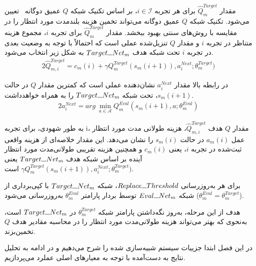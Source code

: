 مقدار $\hat{Q}_m^{Target}$ برای هر تجربه $i \in \mathcal{I}$، بر اساس تکنیک شبکه $Q$ عمیق دوگانه~\cite{wang2016dueling} تعیین می‌شود. تکنیک شبکه $Q$ عمیق دوگانه می‌تواند تخمین هزینه بلندمدت مورد انتظار را در مقایسه با روش‌های سنتی بهبود ببخشد. مقدار $\hat{Q}_m^{Target}$ برای تجربه $i$، مجموع هزینه متناظر در تجربه $i$ و مقدار $Q$ تنزیل‌شده عملی است که احتمالاً با توجه به وضعیت بعدی در تجربه $i$ تحت شبکه هدف $Target\rule{0.25cm}{0.15mm}Net_m$ ‌به شکل زیر انتخاب می‌شود.
\begin{alignat}{2}
	\hat{Q}_{m,i}^{Target} = c_m(i) + \gamma Q_m^{Target}(s_m(i+1)), a_i^{Next}; \theta_m^{Target})
	\label{64}  
\end{alignat}  

در رابطه بالا مقدار $a_i^{Next}$ نشان‌دهنده عملی است که کمترین مقدار $Q$ در حالت $s_m(i+1)$، تحت شبکه $Target\rule{0.25cm}{0.15mm}Net_m$ را به همراه خواهدداشت. 
\begin{alignat}{2}
	a_i^{Next} = arg \  \min\limits_{a \in \mathcal{A}} Q_m^{Eval}(s_m(i+1), a; \theta_m^{Eval})
	\label{65}  
\end{alignat}  





به طور شهودی، برای تجربه i، مقدار $Q$ هدف $\hat{Q}_{m,i}^{Target}$، هزینه طولانی مدت مورد انتظار عمل $a_m(i)$ در حالت $s_m(i)$‌ را نشان می‌دهد. این مقدار خلاصه‌ای از هزینه واقعی ثبت‌شده در تجربه $i$، یعنی $c_m(i)$ و همچنین هزینه تقریبی طولانی‌مدت مورد انتظار آینده بر اساس شبکه هدف $Target\rule{0.25cm}{0.15mm}Net_m$ یعنی $\gamma Q_m^{Target}(s_m(i+1)), a_i^{Next}; \theta_m^{Target})$ است. 


برای هر به‌روزرسانی $Replace\rule{0.25cm}{0.15mm}Threshold$، شبکه $Target\rule{0.25cm}{0.15mm}Net_m$ با کپی‌برداری از شبکه $Eval\rule{0.25cm}{0.15mm}Net_m$  توسط بردار پارامتر $\theta_m^{Eval}$ به‌روزرسانی می‌شود
 ($\theta_m^{Eval} = \theta_m^{Target}$).  


هدف از این مرحله، به‌روز نگه‌داشتن پارامتر شبکه $\theta_m^{Target}$ در $Target\rule{0.25cm}{0.15mm}Net_m$ است، به‌نحوی که بهتر می‌تواند هزینه طولانی‌مدت مورد انتظار را در محاسبه مقادیر هدف $Q$ تخمین‌بزند.








در این فصل ابتدا جزییات سیستم شبیەسازی شده را شرح می‌دهیم و در ادامه به تحلیل نتایج به‌ دست‌‌آمده با توجه به معیارهای اصلی عملرد می‌پردازیم. 

